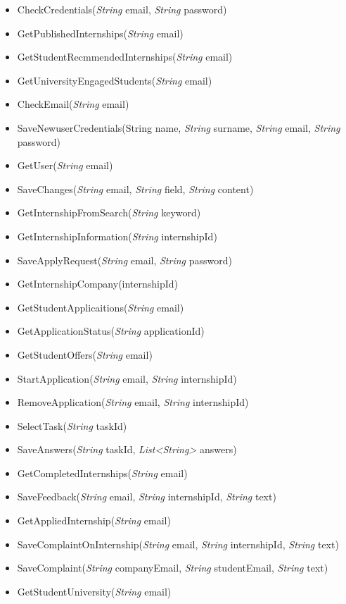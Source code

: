 \begin{itemize}
\begin{itemize}
\item CheckCredentials(\textit{String} email, \textit{String} password)
\item GetPublishedInternships(\textit{String} email)
\item GetStudentRecmmendedInternships(\textit{String} email)
\item GetUniversityEngagedStudents(\textit{String} email)
\item CheckEmail(\textit{String} email)
\item SaveNewuserCredentials(String name, \textit{String} surname, \textit{String} email, \textit{String} password)
\item GetUser(\textit{String} email)
\item SaveChanges(\textit{String} email, \textit{String} field, \textit{String} content)
\item GetInternshipFromSearch(\textit{String} keyword)
\item GetInternshipInformation(\textit{String} internshipId)
\item SaveApplyRequest(\textit{String} email, \textit{String} password)
\item GetInternshipCompany(internshipId)
\item GetStudentApplicaitions(\textit{String} email)
\item GetApplicationStatus(\textit{String} applicationId)
\item GetStudentOffers(\textit{String} email)
\item StartApplication(\textit{String} email, \textit{String} internshipId)
\item RemoveApplication(\textit{String} email, \textit{String}  internshipId)
\item SelectTask(\textit{String} taskId)
\item SaveAnswers(\textit{String} taskId, \textit{List<String>} answers)
\item GetCompletedInternships(\textit{String} email)
\item SaveFeedback(\textit{String} email, \textit{String} internshipId, \textit{String} text)
\item GetAppliedInternship(\textit{String} email)
\item SaveComplaintOnInternship(\textit{String} email, \textit{String} internshipId, \textit{String} text)
\item SaveComplaint(\textit{String} companyEmail, \textit{String} studentEmail, \textit{String} text)
\item GetStudentUniversity(\textit{String} email)

\end{itemize}
\end{itemize}
